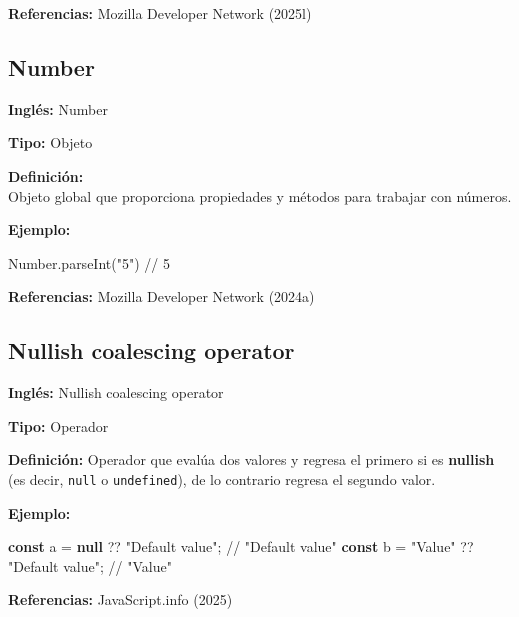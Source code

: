 \documentclass[
  letterpaper,
  DIV=11,
  numbers=noendperiod]{scrreprt}
\newenvironment{Shaded}{\begin{snugshade}}{\end{snugshade}}
\newcommand{\BuiltInTok}[1]{\textcolor[rgb]{0.00,0.23,0.31}{#1}}
\newcommand{\CommentTok}[1]{\textcolor[rgb]{0.37,0.37,0.37}{#1}}
\newcommand{\FunctionTok}[1]{\textcolor[rgb]{0.28,0.35,0.67}{#1}}
\newcommand{\KeywordTok}[1]{\textcolor[rgb]{0.00,0.23,0.31}{\textbf{#1}}}
\newcommand{\NormalTok}[1]{\textcolor[rgb]{0.00,0.23,0.31}{#1}}
\newcommand{\OperatorTok}[1]{\textcolor[rgb]{0.37,0.37,0.37}{#1}}
\newcommand{\StringTok}[1]{\textcolor[rgb]{0.13,0.47,0.30}{#1}}
\let\oldsubsection\subsection
\renewcommand{\subsection}{\phantomsection\oldsubsection}
\begin{document}
\textbf{Referencias:} Mozilla Developer Network (2025l)

\subsection*{Number}\label{glos-number}

\textbf{Inglés:} Number

\textbf{Tipo:} Objeto

\textbf{Definición:}\\
Objeto global que proporciona propiedades y métodos para trabajar con
números.

\textbf{Ejemplo:}

\begin{Shaded}
\begin{Highlighting}[]
\BuiltInTok{Number}\OperatorTok{.}\FunctionTok{parseInt}\NormalTok{(}\StringTok{"5"}\NormalTok{) }\CommentTok{// 5}
\end{Highlighting}
\end{Shaded}

\textbf{Referencias:} Mozilla Developer Network (2024a)

\subsection*{Nullish coalescing operator}\label{glos-nullish_coalescing}

\textbf{Inglés:} Nullish coalescing operator

\textbf{Tipo:} Operador

\textbf{Definición:} Operador que evalúa dos valores y regresa el
primero si es \textbf{nullish} (es decir, \texttt{null} o
\texttt{undefined}), de lo contrario regresa el segundo valor.

\textbf{Ejemplo:}

\begin{Shaded}
\begin{Highlighting}[]
\KeywordTok{const}\NormalTok{ a }\OperatorTok{=} \KeywordTok{null} \OperatorTok{??} \StringTok{"Default value"}\OperatorTok{;} \CommentTok{// "Default value"}
\KeywordTok{const}\NormalTok{ b }\OperatorTok{=} \StringTok{"Value"} \OperatorTok{??} \StringTok{"Default value"}\OperatorTok{;} \CommentTok{// "Value"}
\end{Highlighting}
\end{Shaded}

\textbf{Referencias:} JavaScript.info (2025)
\end{document}
